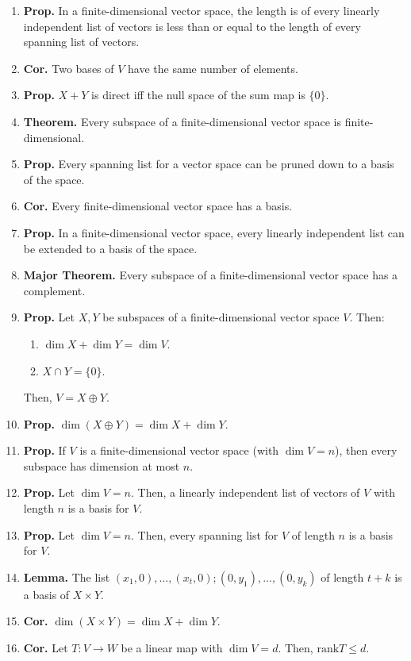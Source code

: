 \begin{enumerate}
	\item \textbf{Prop. } In a finite-dimensional vector space, the length is of every linearly independent list of vectors is less than or equal to the length of every spanning list of vectors. 
	\item \textbf{Cor. } Two bases of $V$ have the same number of elements. 
	\item \textbf{Prop. } $X+Y$ is direct iff the null space of the sum map is $\{0\}$. 
	\item \textbf{Theorem. } Every subspace of a finite-dimensional vector space is finite-dimensional. 
	\item \textbf{Prop. } Every spanning list for a vector space can be pruned down to a basis of the space. 
	\item \textbf{Cor. } Every finite-dimensional vector space has a basis. 
	\item \textbf{Prop. } In a finite-dimensional vector space, every linearly independent list can be extended to a basis of the space. 
	\item \textbf{Major Theorem. } Every subspace of a finite-dimensional vector space has a complement. 
	\item \textbf{Prop. } Let $X,Y$ be subspaces of a finite-dimensional vector space $V$. Then: 
	\begin{enumerate}
		\item $\dim X + \dim Y = \dim V$. 
		\item $X \cap Y = \{0\}$. 
	\end{enumerate}
	Then, $V=X \oplus Y$. 
	\item \textbf{Prop. } $\dim(X \oplus Y) = \dim X + \dim Y$. 
	\item \textbf{Prop. } If $V$ is a finite-dimensional vector space (with $\dim V = n$), then every subspace has dimension at most $n$. 
	\item \textbf{Prop. } Let $\dim V = n$. Then, a linearly independent list of vectors of $V$ with length $n$ is a basis for $V$. 
	\item \textbf{Prop. } Let $\dim V = n$. Then, every spanning list for $V$ of length $n$ is a basis for $V$.
	\item \textbf{Lemma. } The list $(x_1,0),\dots,(x_t,0);(0,y_1),\dots,(0,y_k)$ of length $t+k$ is a basis of $X \times Y$. 
	\item \textbf{Cor. } $\dim (X \times Y) = \dim X + \dim Y$. 
	\item \textbf{Cor. } Let $T: V \to W$ be a linear map with $\dim V = d$. Then, $\textrm{rank}T \leq d$. 

\end{enumerate}
